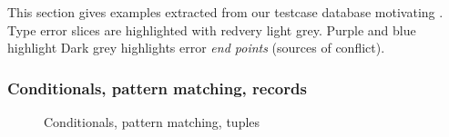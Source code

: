 


This section gives examples extracted from our testcase database
motivating \TES.
%
%
Type error slices are highlighted with \ifincolor
red\else very light grey\fi.  \ifincolor Purple and blue highlight
\else Dark grey highlights \fi error \emph{end points} (sources of
conflict).
%
%


\subsubsection{Conditionals, pattern matching, records}
\label{sec:simpleexample}


\begin{figure}[t]
  \caption{Conditionals, pattern matching, tuples }
  \label{fig:simpleexample}
\end{figure}

